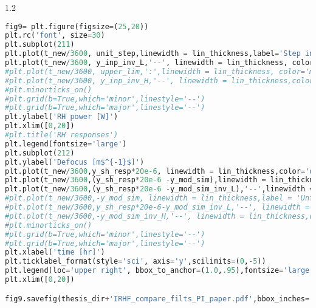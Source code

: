 \begin{spacing}{1.2} \begin{lstlisting}[frame=single,language=Python]
fig9= plt.figure(figsize=(25,20))
plt.rc('font', size=30)
plt.subplot(211)
plt.plot(t_new/3600, unit_step,linewidth = lin_thickness,label='Step input', color= 'purple')
plt.plot(t_new/3600, y_inp_inv_L,'--', linewidth = lin_thickness, color = 'green',label='Filtered input')
#plt.plot(t_new/3600, upper_lim,':',linewidth = lin_thickness, color='magenta', label='RH upper limit')
#plt.plot(t_new/3600, y_inp_inv_H,'--', linewidth = lin_thickness,color = 'red', label='Filtered input (H$^{-1}$(s)G$_{1}$(s))')
#plt.minorticks_on()
#plt.grid(b=True,which='minor',linestyle='--')
#plt.grid(b=True,which='major',linestyle='--')
plt.ylabel('RH power [W]')
plt.xlim([0,20])
#plt.title('RH responses')
plt.legend(fontsize='large')
plt.subplot(212)
plt.ylabel('Defocus [m$^{-1}$]')
plt.plot(t_new/3600,y_sh_resp*20e-6, linewidth = lin_thickness,color='orange',label ='central heating with no RH')
plt.plot(t_new/3600,(y_sh_resp*20e-6 -y_mod_sim),linewidth = lin_thickness,label='central heating + RH w/ step input',color='purple')
plt.plot(t_new/3600,(y_sh_resp*20e-6 -y_mod_sim_inv_L),'--',linewidth = lin_thickness,label='central heating + RH w/ filtered input',color='green')
#plt.plot(t_new/3600,-y_mod_sim, linewidth = lin_thickness,label = 'Unfiltered step input',color='purple')
#plt.plot(t_new/3600,y_sh_resp*20e-6-y_mod_sim_inv_L,'--', linewidth = lin_thickness,color='green',label ='Filtered input (H$^{-1}$(s)G$_{2}$(s))')
#plt.plot(t_new/3600,-y_mod_sim_inv_H,'--', linewidth = lin_thickness,color='red',label ='Filtered input (H$^{-1}$(s)G$_{1}$(s))')
#plt.minorticks_on()
#plt.grid(b=True,which='minor',linestyle='--')
#plt.grid(b=True,which='major',linestyle='--')
plt.xlabel('time [hr]')
plt.ticklabel_format(style='sci', axis='y',scilimits=(0,-5))
plt.legend(loc='upper right', bbox_to_anchor=(1.0,.95),fontsize='large')
plt.xlim([0,20])

fig9.savefig(thesis_dir+'IRHF_compare_filts_PI_paper.pdf',bbox_inches='tight')
\end{lstlisting} \end{spacing}


